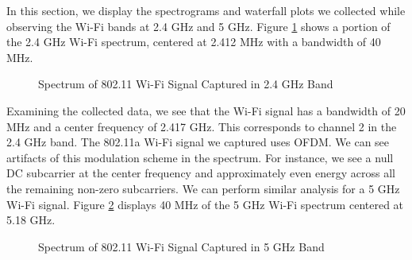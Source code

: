 \documentclass{article}
\begin{document}
In this section, we display the spectrograms and waterfall plots we collected while observing the Wi-Fi bands at 2.4 GHz and 5 GHz. Figure \ref{fig::2_412_wifi_spectrum} shows a portion of the 2.4 GHz Wi-Fi spectrum, centered at 2.412 MHz with a bandwidth of 40 MHz.

\begin{figure}[H]
	\centerline{}
	\caption{Spectrum of 802.11 Wi-Fi Signal Captured in 2.4 GHz Band}
	\label{fig::2_412_wifi_spectrum}
\end{figure}

Examining the collected data, we see that the Wi-Fi signal has a bandwidth of 20 MHz and a center frequency of 2.417 GHz. This corresponds to channel 2 in the 2.4 GHz band. The 802.11a Wi-Fi signal we captured uses OFDM. We can see artifacts of this modulation scheme in the spectrum. For instance, we see a null DC subcarrier at the center frequency and approximately even energy across all the remaining non-zero subcarriers. We can perform similar analysis for a 5 GHz Wi-Fi signal. Figure \ref{fig::5_180g_wifi_spectrum} displays 40 MHz of the 5 GHz Wi-Fi spectrum centered at 5.18 GHz.

\begin{figure}[H]
	\centerline{}
	\caption{Spectrum of 802.11 Wi-Fi Signal Captured in 5 GHz Band}
	\label{fig::5_180g_wifi_spectrum}
\end{figure}
\end{document}
